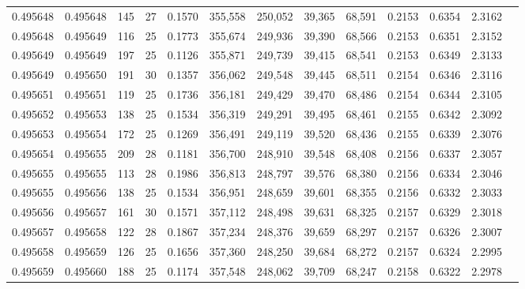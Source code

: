 \begin{tabular}{rrrrrrrrrrrrr}
0.495648 & 0.495648 & 145 &  27 &                                     0.1570 & 355,558 & 250,052 &  39,365 &  68,591 & 0.2153 & 0.6354 & 2.3162 \\
0.495648 & 0.495649 & 116 &  25 &                                     0.1773 & 355,674 & 249,936 &  39,390 &  68,566 & 0.2153 & 0.6351 & 2.3152 \\
0.495649 & 0.495649 & 197 &  25 &                                     0.1126 & 355,871 & 249,739 &  39,415 &  68,541 & 0.2153 & 0.6349 & 2.3133 \\
0.495649 & 0.495650 & 191 &  30 &                                     0.1357 & 356,062 & 249,548 &  39,445 &  68,511 & 0.2154 & 0.6346 & 2.3116 \\
0.495651 & 0.495651 & 119 &  25 &                                     0.1736 & 356,181 & 249,429 &  39,470 &  68,486 & 0.2154 & 0.6344 & 2.3105 \\
0.495652 & 0.495653 & 138 &  25 &                                     0.1534 & 356,319 & 249,291 &  39,495 &  68,461 & 0.2155 & 0.6342 & 2.3092 \\
0.495653 & 0.495654 & 172 &  25 &                                     0.1269 & 356,491 & 249,119 &  39,520 &  68,436 & 0.2155 & 0.6339 & 2.3076 \\
0.495654 & 0.495655 & 209 &  28 &                                     0.1181 & 356,700 & 248,910 &  39,548 &  68,408 & 0.2156 & 0.6337 & 2.3057 \\
0.495655 & 0.495655 & 113 &  28 &                                     0.1986 & 356,813 & 248,797 &  39,576 &  68,380 & 0.2156 & 0.6334 & 2.3046 \\
0.495655 & 0.495656 & 138 &  25 &                                     0.1534 & 356,951 & 248,659 &  39,601 &  68,355 & 0.2156 & 0.6332 & 2.3033 \\
0.495656 & 0.495657 & 161 &  30 &                                     0.1571 & 357,112 & 248,498 &  39,631 &  68,325 & 0.2157 & 0.6329 & 2.3018 \\
0.495657 & 0.495658 & 122 &  28 &                                     0.1867 & 357,234 & 248,376 &  39,659 &  68,297 & 0.2157 & 0.6326 & 2.3007 \\
0.495658 & 0.495659 & 126 &  25 &                                     0.1656 & 357,360 & 248,250 &  39,684 &  68,272 & 0.2157 & 0.6324 & 2.2995 \\
0.495659 & 0.495660 & 188 &  25 &                                     0.1174 & 357,548 & 248,062 &  39,709 &  68,247 & 0.2158 & 0.6322 & 2.2978 \\

\end{tabular}
